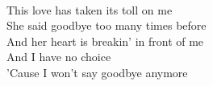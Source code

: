 \\
This love has taken its toll on me \\
She said goodbye too many times before \\
And her heart is breakin' in front of me \\
And I have no choice \\
'Cause I won't say goodbye anymore
